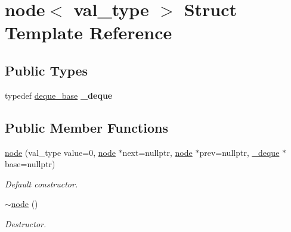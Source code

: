 \hypertarget{structnode}{}\section{node$<$ val\+\_\+type $>$ Struct Template Reference}
\label{structnode}
\subsection*{Public Types}
\begin{DoxyCompactItemize}
\item 
\hypertarget{structnode_a51da4ba33d3e519ebf65b942dd0571c3}{}\label{structnode_a51da4ba33d3e519ebf65b942dd0571c3} 
typedef \hyperlink{classdeque__base}{deque\+\_\+base} {\bfseries \+\_\+deque}
\end{DoxyCompactItemize}
\subsection*{Public Member Functions}
\begin{DoxyCompactItemize}
\item 
\hypertarget{structnode_a019a436409b135cb62d446af7807a8fe}{}\label{structnode_a019a436409b135cb62d446af7807a8fe} 
\hyperlink{structnode_a019a436409b135cb62d446af7807a8fe}{node} (val\+\_\+type value=0, \hyperlink{structnode}{node} $\ast$next=nullptr, \hyperlink{structnode}{node} $\ast$prev=nullptr, \hyperlink{classdeque__base}{\+\_\+deque} $\ast$base=nullptr)
\begin{DoxyCompactList}\small\item\em Default constructor. \end{DoxyCompactList}\item 
\hypertarget{structnode_a92b38b0d6822f08a10912e6b5b98ae9f}{}\label{structnode_a92b38b0d6822f08a10912e6b5b98ae9f} 
\hyperlink{structnode_a92b38b0d6822f08a10912e6b5b98ae9f}{$\sim$node} ()
\begin{DoxyCompactList}\small\item\em Destructor. \end{DoxyCompactList}\end{DoxyCompactItemize}
